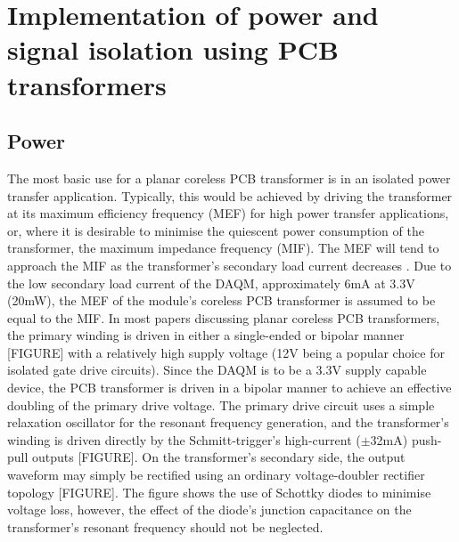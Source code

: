 \documentclass[conference]{IEEEtran}
\begin{document}
\section{Implementation of power and signal isolation using PCB transformers}

	\subsection{Power}
	The most basic use for a planar coreless PCB transformer is in an isolated power transfer application.  Typically, this would be achieved by driving the transformer at its maximum efficiency frequency (MEF) for high power transfer applications, or, where it is desirable to minimise the quiescent power consumption of the transformer, the maximum impedance frequency (MIF).  The MEF will tend to approach the MIF as the transformer's secondary load current decreases \cite{TangHuiFundamental}.  
	Due to the low secondary load current of the DAQM, approximately 6mA at 3.3V (20mW), the MEF of the module's coreless PCB transformer is assumed to be equal to the MIF.  In most papers discussing planar coreless PCB transformers, the primary winding is driven in either a single-ended or bipolar manner [FIGURE] with a relatively high supply voltage (12V being a popular choice for isolated gate drive circuits).  Since the DAQM is to be a 3.3V supply capable device, the PCB transformer is driven in a bipolar manner to achieve an effective doubling of the primary drive voltage.  The primary drive circuit uses a simple relaxation oscillator for the resonant frequency generation, and the transformer's winding is driven directly by the Schmitt-trigger's high-current ($ \pm $32mA) push-pull outputs [FIGURE].
	On the transformer's secondary side, the output waveform may simply be rectified using an ordinary voltage-doubler rectifier topology [FIGURE].  The figure shows the use of Schottky diodes to minimise voltage loss, however, the effect of the diode's junction capacitance on the transformer's resonant frequency should not be neglected.
	
\end{document}
